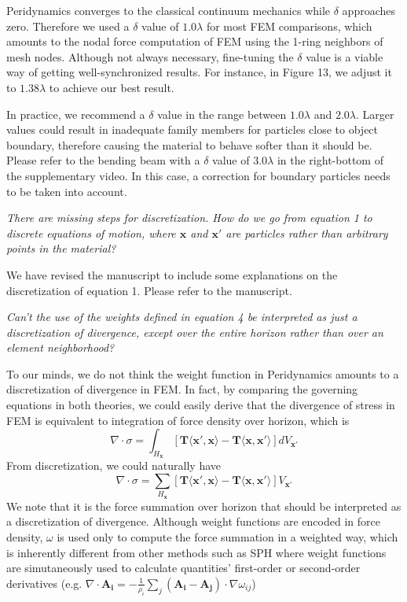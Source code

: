 Peridynamics converges to the classical continuum mechanics while $\delta$ approaches zero\cite{Weckner2005705}. Therefore we used a $\delta$ value of $1.0\lambda$ for most FEM comparisons, which amounts to the nodal force computation of FEM using the 1-ring neighbors of mesh nodes. Although not always necessary, fine-tuning the $\delta$ value is a viable way of getting well-synchronized results. For instance, in Figure 13, we adjust it to $1.38\lambda$ to achieve our best result.

In practice, we recommend a $\delta$ value in the range between $1.0\lambda$ and $2.0\lambda$.
Larger values could result in inadequate family members for particles close to object boundary, therefore causing the material to behave softer than it should be. Please refer to the bending beam with a $\delta$ value of $3.0\lambda$ in the right-bottom of the supplementary video. In this case, a correction for boundary particles needs to be taken into account.

\emph{There are missing steps for discretization. How do we go from equation 1 to discrete equations of motion, where $\mathbf{x}$ and $\mathbf{x'}$ are particles rather than arbitrary points in the material? }

We have revised the manuscript to include some explanations on the discretization of equation 1. Please refer to the manuscript.

\emph{Can't the use of the weights defined in equation 4 be interpreted as just a discretization of divergence, except over the entire horizon rather than over an element neighborhood?}

To our minds, we do not think the weight function in Peridynamics amounts to a discretization of divergence in FEM.
In fact, by comparing the governing equations in both theories, we could easily derive that
the divergence of stress in FEM is equivalent to integration of force density over horizon, which is
\begin{equation}
\nabla\cdot\sigma = \int_{H_\mathbf{x}}[\mathbf{T}\langle\mathbf{x}',\mathbf{x}\rangle - \mathbf{T}\langle\mathbf{x},\mathbf{x}'\rangle]dV_{\mathbf{x}'}
\end{equation}
From discretization, we could naturally have
\begin{equation}
\nabla\cdot\sigma = \sum_{H_\mathbf{x}}[\mathbf{T}\langle\mathbf{x}',\mathbf{x}\rangle - \mathbf{T}\langle\mathbf{x},\mathbf{x}'\rangle]V_{\mathbf{x}'}
\end{equation}
We note that it is the force summation over horizon that should be interpreted as a discretization of divergence.
Although weight functions are encoded in force density, $\omega$ is used only to compute the force summation in a weighted way, which is inherently different from other methods such as SPH where weight functions are simutaneously used to calculate quantities' first-order or second-order derivatives
(e.g. $\nabla\cdot\mathbf{A_i} = -\frac{1}{\rho_i}\sum_j(\mathbf{A_i - A_j})\cdot\nabla\omega_{ij}$)

